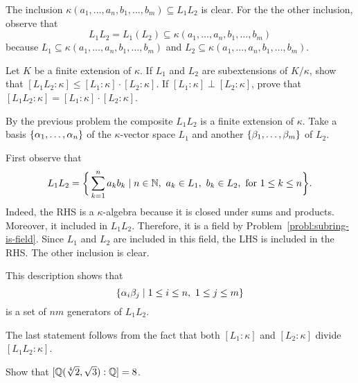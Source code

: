 \begin{solution}
    The inclusion $\kappa(a_1, \dots, a_n, b_1, \dots, b_m)\subseteq L_1L_2$ is clear. For the the other inclusion, observe that
    $$
        L_1L_2 = L_1(L_2)\subseteq \kappa(a_1, \dots, a_n, b_1, \dots, b_m)
    $$
    because $L_1\subseteq\kappa(a_1, \dots, a_n, b_1, \dots, b_m)$ and $L_2\subseteq\kappa(a_1, \dots, a_n, b_1, \dots, b_m)$.
\end{solution}

\begin{probl}
    Let\/ $K$ be a finite extension of\/ $\kappa$. If\/ $L_1$ and\/ $L_2$ are subextensions of\/ $K/\kappa$, show that\/ $[L_1 L_2:\kappa] \leq [L_1:\kappa] \cdot [L_2:\kappa]$. If\/ $[L_1:\kappa]\perp[L_2:\kappa]$, prove that\/ $[L_1 L_2:\kappa] = [L_1:\kappa] \cdot [L_2:\kappa]$.
\end{probl}

\begin{solution}
    By the previous problem the composite $L_1L_2$ is a finite extension of $\kappa$. Take a basis $\{\alpha_1,\dots,\alpha_n\}$ of the $\kappa$-vector space $L_1$ and another $\{\beta_1,\dots,\beta_m\}$ of $L_2$.

    First observe that
    $$
        L_1L_2=\bigg\{
            \sum_{k=1}^na_kb_k\mid n\in\mathbb{N},\ a_k\in L_1,\ b_k\in L_2,
                \text{ for }1\le k\le n
            \bigg\}.
    $$
    Indeed, the RHS is a $\kappa$-algebra because it is closed under sums and products. Moreover, it included in $L_1L_2$. Therefore, it is a field by Problem~\ref{probl:subring-is-field}. Since $L_1$ and $L_2$ are included in this field, the LHS is included in the RHS. The other inclusion is clear.

    This description shows that
    $$
        \{\alpha_i\beta_j\mid 1\le i\le n,\ 1\le j\le m\}
    $$
    is a set of $nm$ generators of $L_1L_2$.

    The last statement follows from the fact that both $[L_1:\kappa]$ and $[L_2:\kappa]$ divide $[L_1L_2:\kappa]$.
\end{solution}


\begin{probl}
    Show that $[\mathbb{Q}(\sqrt[4]2,\sqrt3):\mathbb{Q}]=8$.
\end{probl}

